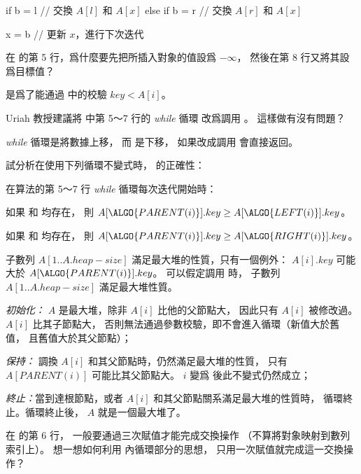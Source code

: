 	if b = l
		// 交換 $A[l]$ 和 $A[x]$
	else if b = r
		// 交換 $A[r]$ 和 $A[x]$

	x = b	// 更新 $x$，進行下次迭代
\stopCLRSCODE
\stopANSWER

\startEXERCISE
在  的第 5 行，爲什麼要先把所插入對象的值設爲 $-\infty$，
然後在第 8 行又將其設爲目標值？
\stopEXERCISE

\startANSWER
是爲了能通過  中的校驗 $key < A[i]$。
\stopANSWER

\startEXERCISE
Uriah 教授建議將  中第 5～7 行的 \emph{while} 循環
改爲調用 。
這樣做有沒有問題？
\stopEXERCISE

\startANSWER
\emph{while} 循環是將數據上移，
而  是下移，
如果改成調用  會直接返回。
\stopANSWER

\startEXERCISE
試分析在使用下列循環不變式時，  的正確性：

在算法的第 5～7 行 \emph{while} 循環每次迭代開始時：
\startigBase[a]
\item 如果  和  均存在，
則 $A[\ALGO{PARENT(i)}].key \ge A[\ALGO{LEFT(i)}].key$。

\item 如果  和  均存在，
則 $A[\ALGO{PARENT(i)}].key \ge A[\ALGO{RIGHT(i)}].key$。

\item 子數列 $A[1..A.heap-size]$ 滿足最大堆的性質，只有一個例外：
$A[i].key$ 可能大於 $A[\ALGO{PARENT(i)}].key$。
\stopigBase
可以假定調用  時，
子數列 $A[1..A.heap-size]$ 滿足最大堆性質。
\stopEXERCISE

\startANSWER
\emph{初始化：} $A$ 是最大堆，除非 $A[i]$ 比他的父節點大，
因此只有 $A[i]$ 被修改過。 $A[i]$ 比其子節點大，
否則無法通過參數校驗，即不會進入循環（新值大於舊值，
 且舊值大於其父節點）；

\emph{保持：} 調換 $A[i]$ 和其父節點時，仍然滿足最大堆的性質，
只有 $A[PARENT(i)]$ 可能比其父節點大。
 $i$ 變爲  後此不變式仍然成立；

\emph{終止：}當到達根節點，或者 $A[i]$ 和其父節點關系滿足最大堆的性質時，
循環終止。循環終止後， $A$ 就是一個最大堆了。
\stopANSWER

\startEXERCISE
在  的第 6 行，
一般要通過三次賦值才能完成交換操作
（不算將對象映射到數列索引上）。
想一想如何利用  內循環部分的思想，
只用一次賦值就完成這一交換操作？
\stopEXERCISE

